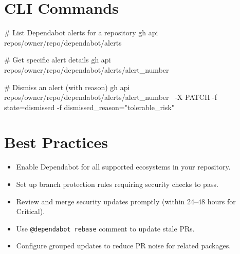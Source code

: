 \documentclass[11pt,letterpaper]{article}
\begin{document}
\section{CLI Commands}

\begin{bashcode}
# List Dependabot alerts for a repository
gh api repos/{owner}/{repo}/dependabot/alerts

# Get specific alert details
gh api repos/{owner}/{repo}/dependabot/alerts/{alert_number}

# Dismiss an alert (with reason)
gh api repos/{owner}/{repo}/dependabot/alerts/{alert_number} \
  -X PATCH -f state=dismissed -f dismissed_reason="tolerable_risk"
\end{bashcode}

\section{Best Practices}

\begin{itemize}
  \item Enable Dependabot for all supported ecosystems in your repository.
  \item Set up branch protection rules requiring security checks to pass.
  \item Review and merge security updates promptly (within 24--48 hours for Critical).
  \item Use \texttt{@dependabot rebase} comment to update stale PRs.
  \item Configure grouped updates to reduce PR noise for related packages.
\end{itemize}
\end{document}
